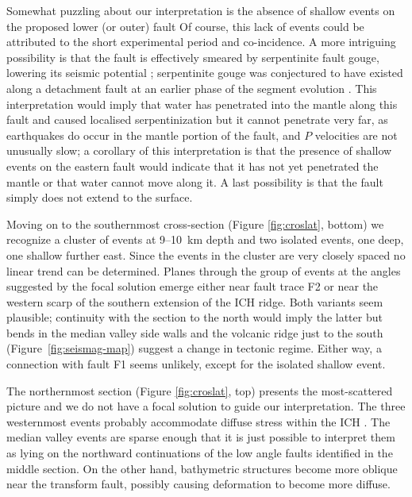 \documentclass[jgr]{agu2001}
\newlength{\tw}
\begin{document}
\begin{article}
   Somewhat puzzling about our
interpretation is the absence of shallow events on the proposed lower
(or outer) fault  Of course, this lack of events could be attributed
to the short experimental period and co-incidence.  A more intriguing
possibility is that the fault is effectively
smeared by serpentinite fault gouge, lowering its seismic potential \citep{reinen00};
serpentinite gouge was conjectured to have existed along a detachment
fault at an earlier phase of the segment evolution \citep[also see
introduction]{reston02}. This interpretation would imply that water
has penetrated into the mantle along this fault and caused localised
serpentinization but it cannot penetrate very far, as earthquakes do occur in
the mantle portion of the fault, and $P$ velocities are not unusually
slow; a corollary of this interpretation is that the presence of
shallow events on the eastern fault would indicate that it has not yet
penetrated the mantle or that water cannot move along it.
A last possibility is that the fault simply does not extend to the
surface. 

Moving on to the southernmost cross-section (Figure \ref{fig:croslat}, bottom)
we recognize a cluster of events at 9--10~km depth and two isolated
events, one deep, one shallow further east.  Since the events in the
cluster are very closely spaced no linear trend can be
determined. Planes through the group of events at the angles suggested
by the focal solution emerge either near fault trace F2 or near the
western scarp of the southern extension of the ICH ridge.  Both
variants seem plausible; continuity with the section to the north
would imply the latter but bends in the median valley side walls
 and the volcanic ridge just to the south (Figure~\ref{fig:seismag-map}) suggest
a change in tectonic regime.  Either way, a connection with fault F1
seems unlikely, except for the isolated shallow event.

The northernmost section (Figure \ref{fig:croslat}, top) presents the
most-scattered picture and we do not have a focal solution to guide
our interpretation.  The three westernmost events probably
accommodate diffuse stress within the ICH .  The median valley events
are sparse enough that it is just possible to interpret them as lying
on the northward continuations of the low angle faults identified in
the middle section.  On the other hand, bathymetric structures become
more oblique near the transform fault, possibly causing
deformation to become more diffuse. 


\end{article}
\end{document}
